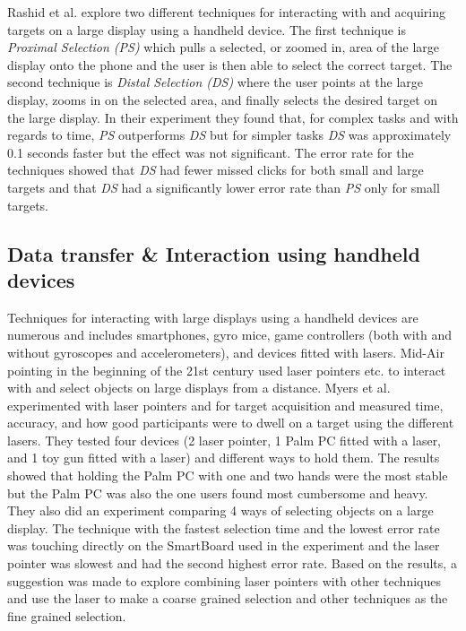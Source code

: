 Rashid et al. \cite{Rashid:2011} explore two different techniques for interacting with and acquiring targets on a large display using a handheld device.
The first technique is \emph{Proximal Selection (PS)} which pulls a selected, or zoomed in, area of the large display onto the phone and the user is then able to select the correct target.
The second technique is \emph{Distal Selection (DS)} where the user points at the large display, zooms in on the selected area, and finally selects the desired target on the large display.
In their experiment they found that, for complex tasks and with regards to time, \emph{PS} outperforms \emph{DS} but for simpler tasks \emph{DS} was approximately 0.1 seconds faster but the effect was not significant.
The error rate for the techniques showed that \emph{DS} had fewer missed clicks for both small and large targets and that \emph{DS} had a significantly lower error rate than \emph{PS} only for small targets.

\subsection{Data transfer \& Interaction using handheld devices} \label{sec:targetAcquisition}
Techniques for interacting with large displays using a handheld devices are numerous and includes smartphones, gyro mice, game controllers (both with and without gyroscopes and accelerometers), and devices fitted with lasers.
Mid-Air pointing in the beginning of the 21st century used laser pointers etc. to interact with and select objects on large displays from a distance. 
Myers et al. \cite{Myers:2002} experimented with laser pointers and for target acquisition and measured time, accuracy, and how good participants were to dwell on a target using the different lasers.
They tested four devices (2 laser pointer, 1 Palm PC fitted with a laser, and 1 toy gun fitted with a laser) and different ways to hold them. 
The results showed that holding the Palm PC with one and two hands were the most stable but the Palm PC was also the one users found most cumbersome and heavy. 
They also did an experiment comparing 4 ways of selecting objects on a large display.
The technique with the fastest selection time and the lowest error rate was touching directly on the SmartBoard used in the experiment and the laser pointer was slowest and had the second highest error rate.
Based on the results, a suggestion was made to explore combining laser pointers with other techniques and use the laser to make a coarse grained selection and other techniques as the fine grained selection.

